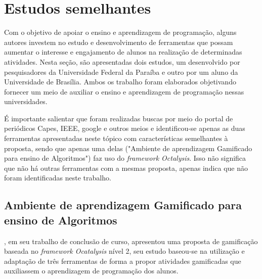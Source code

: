 \section{Estudos semelhantes}

Com o objetivo de apoiar o ensino e aprendizagem de programação, alguns autores investem no estudo e desenvolvimento
de ferramentas que possam aumentar o interesse e engajamento de alunos na realização de determinadas atividades. Nesta
seção, são apresentadas dois estudos, um desenvolvido por pesquisadores da Universidade Federal da Paraíba e outro por um aluno
da Universidade de Brasília. Ambos os trabalho foram elaborados objetivando fornecer um meio de auxiliar o ensino e aprendizagem 
de programação nessas universidades.

É importante salientar que foram realizadas buscas por meio do portal de periódicos Capes, IEEE, google e outros meios e identificou-se
apenas as duas ferramentas apresentadas neste tópico com características semelhantes à proposta, sendo que apenas uma delas ("Ambiente de aprendizagem Gamificado para ensino de Algoritmos")
faz uso do \textit{framework Octalysis}. Isso não significa que não há outras ferramentas com a mesmas proposta, apenas indica que não foram identificadas neste trabalho.

\subsection{Ambiente de aprendizagem Gamificado para ensino de Algoritmos}

, em seu trabalho de conclusão de curso, apresentou uma proposta de gamificação baseada no \textit{framework Ocatalysis} nível 2, seu estudo baseou-se na
utilização e adaptação de três ferramentas de forma a propor atividades gamificadas que auxiliassem o aprendizagem de programação dos alunos.

